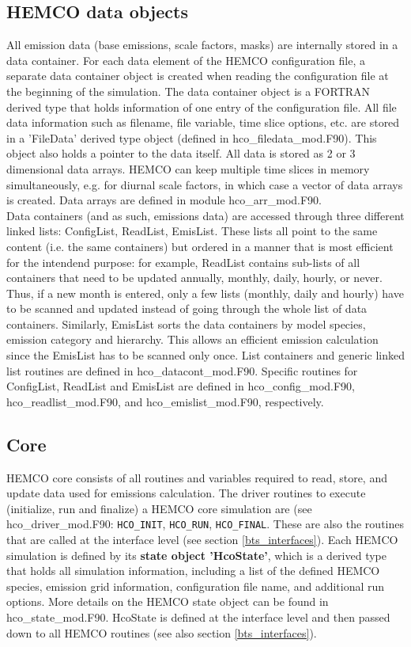 \documentclass[12pt,a4paper]{article} %
\begin{document}
\subsection{HEMCO data objects} \label{bts_data_objects}
All emission data (base emissions, scale factors, masks) are internally stored in a data container. For each data element of the HEMCO configuration file, a separate data container object is created when reading the configuration file at the beginning of the simulation. The data container object is a FORTRAN derived type that holds information of one entry of the configuration file. All file data information such as filename, file variable, time slice options, etc. are stored in a 'FileData' derived type object (defined in hco\_filedata\_mod.F90). This object also holds a pointer to the data itself. All data is stored as 2 or 3 dimensional data arrays. HEMCO can keep multiple time slices in memory simultaneously, e.g. for diurnal scale factors, in which case a vector of data arrays is created. Data arrays are defined in module hco\_arr\_mod.F90.\\
Data containers (and as such, emissions data) are accessed through three different linked lists: ConfigList, ReadList, EmisList. These lists all point to the same content (i.e. the same containers) but ordered in a manner that is most efficient for the intendend purpose: for example, ReadList contains sub-lists of all containers that need to be updated annually, monthly, daily, hourly, or never. Thus, if a new month is entered, only a few lists (monthly, daily and hourly) have to be scanned and updated instead of going through the whole list of data containers. Similarly, EmisList sorts the data containers by model species, emission category and hierarchy. This allows an efficient emission calculation since the EmisList has to be scanned only once. List containers and generic linked list routines are defined in hco\_datacont\_mod.F90. Specific routines for ConfigList, ReadList and EmisList are defined in hco\_config\_mod.F90, hco\_readlist\_mod.F90, and hco\_emislist\_mod.F90, respectively.

\subsection{Core} \label{bts_core}
HEMCO core consists of all routines and variables required to read, store, and update data used for emissions calculation. The driver routines to execute (initialize, run and finalize) a HEMCO core simulation are (see hco\_driver\_mod.F90: \texttt{HCO\_INIT}, \texttt{HCO\_RUN}, \texttt{HCO\_FINAL}. These are also the routines that are called at the interface level (see section \ref{bts_interfaces}). Each HEMCO simulation is defined by its \textbf{state object 'HcoState'}, which is a derived type that holds all simulation information, including a list of the defined HEMCO species, emission grid information, configuration file name, and additional run options. More details on the HEMCO state object can be found in hco\_state\_mod.F90. HcoState is defined at the interface level and then passed down to all HEMCO routines (see also section \ref{bts_interfaces}).\\
\end{document}
